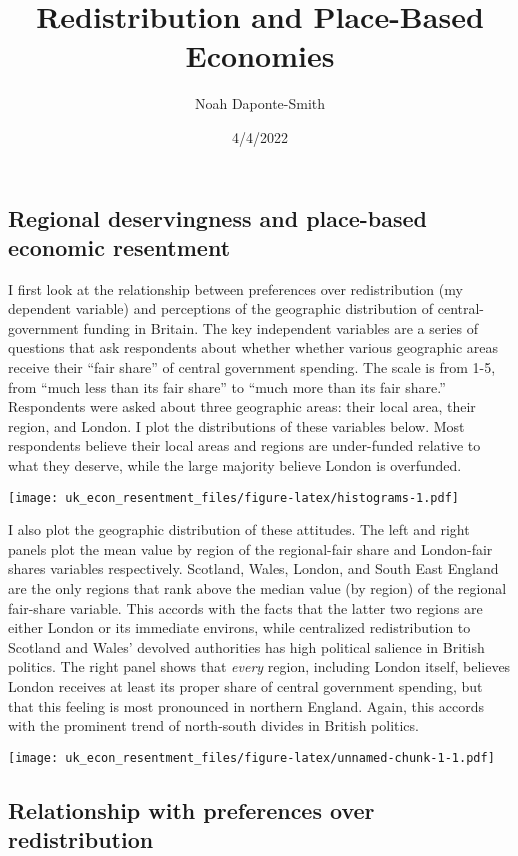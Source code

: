 \documentclass[
]{article}
\title{Redistribution and Place-Based Economies}
\author{Noah Daponte-Smith}
\date{4/4/2022}
\begin{document}
\maketitle

\hypertarget{regional-deservingness-and-place-based-economic-resentment}{%
\subsection{Regional deservingness and place-based economic
resentment}\label{regional-deservingness-and-place-based-economic-resentment}}

I first look at the relationship between preferences over redistribution
(my dependent variable) and perceptions of the geographic distribution
of central-government funding in Britain. The key independent variables
are a series of questions that ask respondents about whether whether
various geographic areas receive their ``fair share'' of central
government spending. The scale is from 1-5, from ``much less than its
fair share'' to ``much more than its fair share.'' Respondents were
asked about three geographic areas: their local area, their region, and
London. I plot the distributions of these variables below. Most
respondents believe their local areas and regions are under-funded
relative to what they deserve, while the large majority believe London
is overfunded.

\texttt{[image: uk\_econ\_resentment\_files/figure-latex/histograms-1.pdf]}

I also plot the geographic distribution of these attitudes. The left and
right panels plot the mean value by region of the regional-fair share
and London-fair shares variables respectively. Scotland, Wales, London,
and South East England are the only regions that rank above the median
value (by region) of the regional fair-share variable. This accords with
the facts that the latter two regions are either London or its immediate
environs, while centralized redistribution to Scotland and Wales'
devolved authorities has high political salience in British politics.
The right panel shows that \textit{every} region, including London
itself, believes London receives at least its proper share of central
government spending, but that this feeling is most pronounced in
northern England. Again, this accords with the prominent trend of
north-south divides in British politics.

\texttt{[image: uk\_econ\_resentment\_files/figure-latex/unnamed-chunk-1-1.pdf]}

\hypertarget{relationship-with-preferences-over-redistribution}{%
\subsection{Relationship with preferences over
redistribution}\label{relationship-with-preferences-over-redistribution}}
\end{document}
